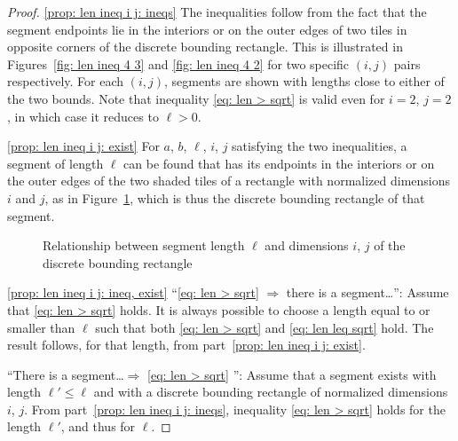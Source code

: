 \documentclass[12pt, a4paper]{article}
\newcommand{\len}{\ell} %
\begin{document}
\begin{proof}
\ref*{prop: len ineq i j: ineqs} The inequalities follow from the fact that the segment endpoints lie in the interiors or on the outer edges of two tiles in opposite corners of the discrete bounding rectangle. This is illustrated in Figures~\ref{fig: len ineq 4 3} and \ref{fig: len ineq 4 2} for two specific $(i,j)$ pairs respectively. For each $(i,j)$, segments are shown with lengths close to either of the two bounds. Note that inequality \eqref{eq: len > sqrt} is valid even for $i=2$, $j=2$, in which case it reduces to $\len>0$.

\ref*{prop: len ineq i j: exist} For $a$, $b$, $\len$, $i$, $j$ satisfying the two inequalities, a segment of length $\len$ can be found that has its endpoints in the interiors or on the outer edges of the two shaded tiles of a rectangle with normalized dimensions $i$ and $j$, as in Figure~\ref{fig: len ineq i j}, which is thus the discrete bounding rectangle of that segment.
\begin{figure}
\centering%
\hfill%
%
\caption{Relationship between segment length $\len$ and dimensions $i$, $j$ of the discrete bounding rectangle
}%
\label{fig: len ineq i j}
\end{figure}%

\ref*{prop: len ineq i j: ineq, exist} ``\eqref{eq: len > sqrt} $\Rightarrow$ there is a segment\ldots'': Assume that \eqref{eq: len > sqrt} holds. It is always possible to choose a length equal to or smaller than $\len$ such that both \eqref{eq: len > sqrt} and \eqref{eq: len leq sqrt} hold. The result follows, for that length, from part~\ref{prop: len ineq i j: exist}.

``There is a segment\ldots $\Rightarrow$ \eqref{eq: len > sqrt} '': Assume that a segment exists with length $\len' \leq \len$ and with a discrete bounding rectangle of normalized dimensions $i$, $j$. From part~\ref{prop: len ineq i j: ineqs}, inequality \eqref{eq: len > sqrt} holds for the length $\len'$, and thus for $\len$.
\end{proof}
\end{document}
